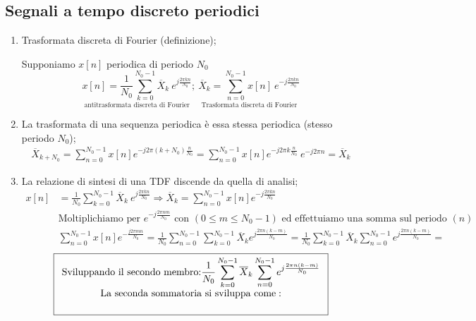 \documentclass[
]{article}
\begin{document}
\subsection{Segnali a tempo discreto
periodici}\label{segnali-a-tempo-discreto-periodici}

\begin{enumerate}
\def\labelenumi{\arabic{enumi}.}
\setcounter{enumi}{12}
\item
  Trasformata discreta di Fourier (definizione);

  Supponiamo \(x[n]\) periodica di periodo \(N_0\) \[
  \underset{\text{antitrasformata discreta di Fourier}}{x[n]=\frac{1}{N_0}\sum_{k=0}^{N_0 -1}\overline{X}_{k} \ e^{j\frac{2\pi kn}{N_0}}}; \
  \underset{\text{Trasformata discreta di Fourier}} {\overline{X}_k = \sum_{n=0}^{N_0 -1} x[n] \ e^{-j \frac{2\pi kn}{N_0}}}
  \]
\item
  La trasformata di una sequenza periodica è essa stessa periodica
  (stesso periodo \(N_0\)); \begin{gather*}
  \overline{X}_{k+N_0} = \sum_{n=0}^{N_0 -1} x[n] e^{-j2\pi(k+N_0)\frac{n}{N_0}} = \sum_{n=0}^{N_0 -1} x[n] e^{-j2\pi k\frac{n}{N_0}} \ e^{-j2\pi n} = \overline{X}_k
  \end{gather*}
\item
  La relazione di sintesi di una TDF discende da quella di analisi;
  \begin{align*}
  x[n] &=\frac{1}{N_0} \sum_{k=0}^{N_0 -1} \overline{X}_k \ e^{j\frac{2\pi kn}{N_0}} \Rightarrow \overline{X}_k = \sum_{n=0}^{N_0 -1} x[n] e^{-j\frac{2\pi kn}{N_0}} \\
  &\text{Moltiplichiamo per } e^{-j \frac{2\pi nm}{N_0}} \text{ con } (0\leq m \leq N_0 - 1) \text{ ed effettuiamo una somma sul periodo } (n)& \\
  &\sum_{n=0}^{N_0 -1} x[n] e^{-\frac{j2\pi mn}{N_0}} =\frac{1}{N_0} \sum_{n=0}^{N_0 -1} \sum_{k=0}^{N_0 -1}\overline{X}_k e^{j\frac{2\pi n(k-m)}{N_0}} = \frac{1}{N_0}\sum_{k=0}^{N_0 -1}\overline{X}_k \sum_{n=0}^{N_0 -1} e^{j\frac{2\pi n(k-m)}{N_0}}= 
  \end{align*} \begin{align*}
  \boxed{
      \begin{array}{cl}
          \text{Sviluppando il secondo membro:}
          \displaystyle\frac{1}{N_0}\sum_{k=0}^{N_0 -1}\overline{X}_k \sum_{n=0}^{N_0 -1} e^{j\frac{2\pi n(k-m)}{N_0}} \\
          \text{La seconda sommatoria si sviluppa come}: \\
          \displaystyle 

\end{array}}
\end{align*}
\end{enumerate}
\end{document}
